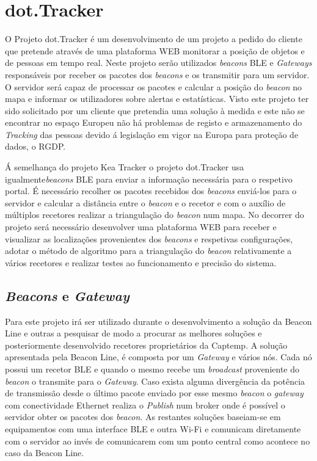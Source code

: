 \section{dot.Tracker} \label{dot.tracker}


\par O Projeto dot.Tracker é um desenvolvimento de um projeto a pedido do cliente que pretende através de uma plataforma WEB monitorar a posição de objetos e de pessoas em tempo real. Neste projeto serão utilizados \textit{beacons} BLE e \textit{Gateways} responsáveis por receber os pacotes dos \textit{beacons} e os transmitir para um servidor. O servidor será capaz de processar os pacotes e calcular a posição do \textit{beacon} no mapa e informar os utilizadores sobre alertas e estatísticas. Visto este projeto ter sido solicitado por um cliente que pretendia uma solução à medida e este não se encontrar no espaço Europeu não há problemas de registo e armazenamento do \textit{Tracking} das pessoas devido á legislação em vigor na Europa para proteção de dados, o RGDP.

Á semelhança do projeto Kea Tracker o projeto dot.Tracker usa igualmente\textit{beacons} BLE para enviar a informação necessária para o respetivo portal. É necessário recolher os pacotes recebidos dos \textit{beacons} enviá-los para o servidor e calcular a distância entre o \textit{beacon} e o recetor e com o auxílio de múltiplos recetores realizar a triangulação do \textit{beacon} num mapa. No decorrer do projeto será necessário desenvolver uma plataforma WEB para receber e visualizar as localizações provenientes dos \textit{beacons} e respetivas configurações, adotar o método de algoritmo para a triangulação do \textit{beacon} relativamente a vários recetores e realizar testes ao funcionamento e precisão do sistema.

\subsection{\textit{Beacons} e \textit{Gateway}}
Para este projeto irá ser utilizado durante o desenvolvimento a solução da Beacon Line\cite{taskit} e outras a pesquisar de modo a procurar as melhores soluções e posteriormente desenvolvido recetores proprietários da Captemp. A solução apresentada pela Beacon Line, é composta por um \textit{Gateway} e vários nós. Cada nó possui um recetor BLE e quando o mesmo recebe um \textit{broadcast} proveniente do \textit{beacon} o transmite para o \textit{Gateway}. Caso exista alguma divergência da potência de transmissão desde o último pacote enviado por esse mesmo \textit{beacon} o \textit{gateway} com conectividade Ethernet realiza o \textit{Publish} num broker onde é possível o servidor obter os pacotes dos \textit{beacon}. As restantes soluções baseiam-se em equipamentos com uma interface BLE e outra Wi-Fi e comunicam diretamente com o servidor ao invés de comunicarem com um ponto central como acontece no caso da Beacon Line.


